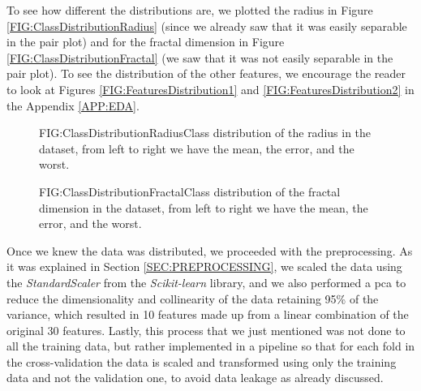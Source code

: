 To see how different the distributions are, we plotted the radius in Figure \ref{FIG:ClassDistributionRadius} (since we already saw that it was easily separable in the pair plot) and for the fractal dimension in Figure \ref{FIG:ClassDistributionFractal} (we saw that it was not easily separable in the pair plot). To see the distribution of the other features, we encourage the reader to look at Figures \ref{FIG:FeaturesDistribution1} and \ref{FIG:FeaturesDistribution2} in the Appendix \ref{APP:EDA}.


\begin{figure}[Class Distribution of the Radius]{FIG:ClassDistributionRadius}{Class distribution of the radius in the dataset, from left to right we have the mean, the error, and the worst.}
\end{figure}

\begin{figure}[Class Distribution of the Fractal Dimension]{FIG:ClassDistributionFractal}{Class distribution of the fractal dimension in the dataset, from left to right we have the mean, the error, and the worst.}
\end{figure}

Once we knew the data was distributed, we proceeded with the preprocessing. As it was explained in Section \ref{SEC:PREPROCESSING}, we scaled the data using the \textit{StandardScaler} from the \textit{Scikit-learn} library, and we also performed a \ac{pca} to reduce the dimensionality and collinearity of the data retaining 95\% of the variance, which resulted in 10 features made up from a linear combination of the original 30 features. Lastly, this process that we just mentioned was not done to all the training data, but rather implemented in a pipeline so that for each fold in the cross-validation the data is scaled and transformed using only the training data and not the validation one, to avoid data leakage as already discussed.